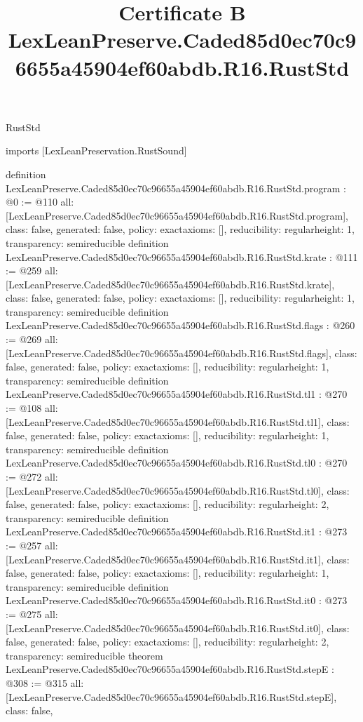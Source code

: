 \begin{lexlean}{RustStd}
\title{Certificate B LexLeanPreserve.Caded85d0ec70c96655a45904ef60abdb.R16.RustStd}
\begin{coremodule}
imports [LexLeanPreservation.RustSound]

definition LexLeanPreserve.Caded85d0ec70c96655a45904ef60abdb.R16.RustStd.program : @0 := @110 {
  all: [LexLeanPreserve.Caded85d0ec70c96655a45904ef60abdb.R16.RustStd.program],
  class: false,
  generated: false,
  policy: exact{axioms: []},
  reducibility: regular{height: 1},
  transparency: semireducible
}
definition LexLeanPreserve.Caded85d0ec70c96655a45904ef60abdb.R16.RustStd.krate : @111 := @259 {
  all: [LexLeanPreserve.Caded85d0ec70c96655a45904ef60abdb.R16.RustStd.krate],
  class: false,
  generated: false,
  policy: exact{axioms: []},
  reducibility: regular{height: 1},
  transparency: semireducible
}
definition LexLeanPreserve.Caded85d0ec70c96655a45904ef60abdb.R16.RustStd.flags : @260 := @269 {
  all: [LexLeanPreserve.Caded85d0ec70c96655a45904ef60abdb.R16.RustStd.flags],
  class: false,
  generated: false,
  policy: exact{axioms: []},
  reducibility: regular{height: 1},
  transparency: semireducible
}
definition LexLeanPreserve.Caded85d0ec70c96655a45904ef60abdb.R16.RustStd.tl1 : @270 := @108 {
  all: [LexLeanPreserve.Caded85d0ec70c96655a45904ef60abdb.R16.RustStd.tl1],
  class: false,
  generated: false,
  policy: exact{axioms: []},
  reducibility: regular{height: 1},
  transparency: semireducible
}
definition LexLeanPreserve.Caded85d0ec70c96655a45904ef60abdb.R16.RustStd.tl0 : @270 := @272 {
  all: [LexLeanPreserve.Caded85d0ec70c96655a45904ef60abdb.R16.RustStd.tl0],
  class: false,
  generated: false,
  policy: exact{axioms: []},
  reducibility: regular{height: 2},
  transparency: semireducible
}
definition LexLeanPreserve.Caded85d0ec70c96655a45904ef60abdb.R16.RustStd.it1 : @273 := @257 {
  all: [LexLeanPreserve.Caded85d0ec70c96655a45904ef60abdb.R16.RustStd.it1],
  class: false,
  generated: false,
  policy: exact{axioms: []},
  reducibility: regular{height: 1},
  transparency: semireducible
}
definition LexLeanPreserve.Caded85d0ec70c96655a45904ef60abdb.R16.RustStd.it0 : @273 := @275 {
  all: [LexLeanPreserve.Caded85d0ec70c96655a45904ef60abdb.R16.RustStd.it0],
  class: false,
  generated: false,
  policy: exact{axioms: []},
  reducibility: regular{height: 2},
  transparency: semireducible
}
theorem LexLeanPreserve.Caded85d0ec70c96655a45904ef60abdb.R16.RustStd.stepE : @308 := @315 {
  all: [LexLeanPreserve.Caded85d0ec70c96655a45904ef60abdb.R16.RustStd.stepE],
  class: false,
}
\end{coremodule}
\end{lexlean}
